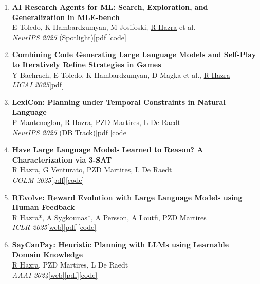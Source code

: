 \documentclass[a4paper,10pt]{article}
\newcommand{\cvlink}[2]{\href{#2}{\small\textcolor{accent}{[#1]}}}
\begin{document}
\begin{enumerate}[leftmargin=1.6em, label={\small\arabic*.}, itemsep=2pt]
  \item \textbf{AI Research Agents for ML: Search, Exploration, and Generalization in MLE-bench}\\
    E Toledo, K Hambardzumyan, M Josifoski, \underline{R Hazra} et al.\\
    \textit{NeurIPS 2025} (Spotlight)\quad\cvlink{pdf}{https://arxiv.org/abs/2507.02554}\;\cvlink{code}{https://github.com/facebookresearch/aira-dojo}

  \item \textbf{Combining Code Generating Large Language Models and Self-Play to Iteratively Refine Strategies in Games}\\
    Y Bachrach, E Toledo, K Hambardzumyan, D Magka et al., \underline{R Hazra}\\
    \textit{IJCAI 2025}\quad\cvlink{pdf}{https://www.ijcai.org/proceedings/2025/1249.pdf}

  \item \textbf{LexiCon: Planning under Temporal Constraints in Natural Language}\\
    P Mantenoglou, \underline{R Hazra}, PZD Martires, L De Raedt\\
    \textit{NeurIPS 2025} (DB Track)\quad\cvlink{pdf}{https://openreview.net/pdf?id=wxFfPVPtdy}\;\cvlink{code}{https://github.com/periklismant/lexicon_neurips}

  \item \textbf{Have Large Language Models Learned to Reason? A Characterization via 3-SAT}\\
    \underline{R Hazra}, G Venturato, PZD Martires, L De Raedt\\
    \textit{COLM 2025}\quad\cvlink{pdf}{https://openreview.net/pdf?id=MPTlWIVSMU}\;\cvlink{code}{https://github.com/RishiHazra/Revolve/tree/main}

  \item \textbf{REvolve: Reward Evolution with Large Language Models using Human Feedback}\\
    \underline{R Hazra*}, A Sygkounas*, A Persson, A Loutfi, PZD Martires\\
    \textit{ICLR 2025}\quad\cvlink{web}{https://rishihazra.github.io/REvolve/}\;\cvlink{pdf}{https://arxiv.org/pdf/2406.01309}\;\cvlink{code}{https://github.com/RishiHazra/Revolve/tree/main}

  \item \textbf{SayCanPay: Heuristic Planning with LLMs using Learnable Domain Knowledge}\\
    \underline{R Hazra}, PZD Martires, L De Raedt\\
    \textit{AAAI 2024}\quad\cvlink{web}{https://rishihazra.github.io/SayCanPay/}\;\cvlink{pdf}{https://arxiv.org/pdf/2308.12682.pdf}\;\cvlink{code}{https://github.com/RishiHazra/saycanpay}


\end{enumerate}
\end{document}
